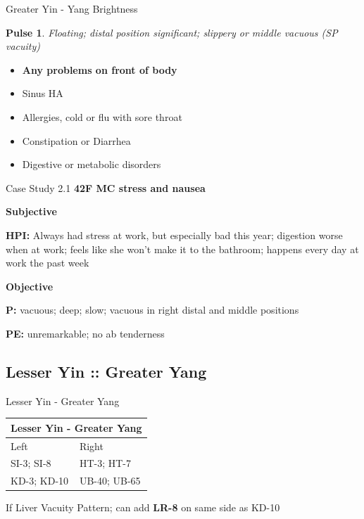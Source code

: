 \begin{frame}{Greater Yin - Yang Brightness}
\newtheorem{pulse}{Pulse}

\begin{pulse}
Floating; distal position significant; slippery or middle vacuous (SP vacuity)
\end{pulse}

\begin{itemize}
\item \textbf{Any problems on front of body}
\item Sinus HA
\item Allergies, cold or flu with sore throat
\item Constipation or Diarrhea
\item Digestive or metabolic disorders
\end{itemize}

\end{frame}

\begin{frame}{Case Study 2.1}
  \textbf{\Large 42F MC stress and nausea}
  
  \textbf{\large Subjective}
  
  \textbf{HPI:} Always had stress at work, but especially bad this year; digestion worse when at work; feels like she won't make it to the bathroom; happens every day at work the past week

  \textbf{\large Objective}
  
  \textbf{P:} vacuous; deep; slow; vacuous in right distal and middle positions

  \textbf{PE:} unremarkable; no ab tenderness

\end{frame}

\subsection{Lesser Yin :: Greater Yang}

\begin{frame}{Lesser Yin - Greater Yang}

\begin{table}[]
\begin{tabular}{@{}ll@{}}
\toprule
\multicolumn{2}{l}{Lesser Yin - Greater Yang} \\ \midrule
Left                  & Right                 \\
SI-3; SI-8            & HT-3; HT-7            \\
KD-3; KD-10           & UB-40; UB-65          \\ \bottomrule
\end{tabular}
\end{table}

\vspace{2em}

If Liver Vacuity Pattern; can add \textbf{LR-8} on same side as KD-10

\end{frame}

